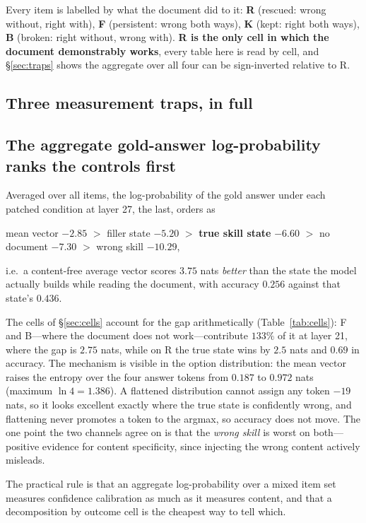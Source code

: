 \documentclass{article}
\begin{document}
Every item is labelled by what the document did to it: \textbf{R} (rescued:
wrong without, right with), \textbf{F} (persistent: wrong both ways), \textbf{K}
(kept: right both ways), \textbf{B} (broken: right without, wrong with).
\textbf{R is the only cell in which the document demonstrably works}, every table
here is read by cell, and \S\ref{sec:traps} shows the aggregate over all four can
be sign-inverted relative to R.




\subsection{Three measurement traps, in full}
\label{app:traps}

\subsection{The aggregate gold-answer log-probability ranks the controls first}

Averaged over all items, the log-probability of the gold answer under each
patched condition at layer 27, the last, orders as
\begin{center}
mean vector $-2.85$ \; $>$ \; filler state $-5.20$ \; $>$ \; \textbf{true skill
state} $-6.60$ \; $>$ \; no document $-7.30$ \; $>$ \; wrong skill $-10.29$,
\end{center}
i.e.\ a content-free average vector scores $3.75$ nats \emph{better} than the
state the model actually builds while reading the document, with accuracy
$0.256$ against that state's $0.436$.

The cells of \S\ref{sec:cells} account for the gap arithmetically
(Table~\ref{tab:cells}): F and B---where the document does not work---contribute
$133\%$ of it at layer 21, where the gap is $2.75$ nats, while on R the true state wins by $2.5$ nats and $0.69$ in
accuracy. The mechanism is visible in the option distribution: the mean vector
raises the entropy over the four answer tokens from $0.187$ to $0.972$ nats
(maximum $\ln 4 = 1.386$). A flattened distribution cannot assign any token
$-19$ nats, so it looks excellent exactly where the true state is confidently
wrong, and flattening never promotes a token to the argmax, so accuracy does not
move. The one point the two channels agree on is that the \emph{wrong skill} is
worst on both---positive evidence for content specificity, since injecting the
wrong content actively misleads.

The practical rule is that an aggregate log-probability over a mixed item set
measures confidence calibration as much as it measures content, and that a
decomposition by outcome cell is the cheapest way to tell which.
\end{document}
